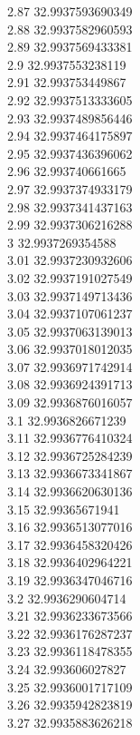 {2.87	32.9937593690349\\
2.88	32.9937582960593\\
2.89	32.9937569433381\\
2.9	32.9937553238119\\
2.91	32.993753449867\\
2.92	32.9937513333605\\
2.93	32.9937489856446\\
2.94	32.9937464175897\\
2.95	32.9937436396062\\
2.96	32.993740661665\\
2.97	32.9937374933179\\
2.98	32.9937341437163\\
2.99	32.9937306216288\\
3	32.9937269354588\\
3.01	32.9937230932606\\
3.02	32.9937191027549\\
3.03	32.9937149713436\\
3.04	32.9937107061237\\
3.05	32.9937063139013\\
3.06	32.9937018012035\\
3.07	32.9936971742914\\
3.08	32.9936924391713\\
3.09	32.9936876016057\\
3.1	32.9936826671239\\
3.11	32.9936776410324\\
3.12	32.9936725284239\\
3.13	32.9936673341867\\
3.14	32.9936620630136\\
3.15	32.99365671941\\
3.16	32.9936513077016\\
3.17	32.9936458320426\\
3.18	32.9936402964221\\
3.19	32.9936347046716\\
3.2	32.9936290604714\\
3.21	32.9936233673566\\
3.22	32.9936176287237\\
3.23	32.9936118478355\\
3.24	32.993606027827\\
3.25	32.9936001717109\\
3.26	32.9935942823819\\
3.27	32.9935883626218\\
}
